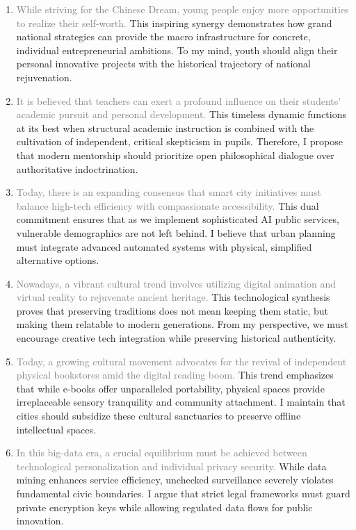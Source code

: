 ﻿\documentclass[lang=cn,11pt]{elegantbook}
\begin{document}
\begin{enumerate}
    \item \textcolor{gray}{While striving for the Chinese Dream, young people enjoy more opportunities to realize their self-worth.} This inspiring synergy demonstrates how grand national strategies can provide the macro infrastructure for concrete, individual entrepreneurial ambitions. To my mind, youth should align their personal innovative projects with the historical trajectory of national rejuvenation.
    \item \textcolor{gray}{It is believed that teachers can exert a profound influence on their students' academic pursuit and personal development.} This timeless dynamic functions at its best when structural academic instruction is combined with the cultivation of independent, critical skepticism in pupils. Therefore, I propose that modern mentorship should prioritize open philosophical dialogue over authoritative indoctrination.
    \item \textcolor{gray}{Today, there is an expanding consensus that smart city initiatives must balance high-tech efficiency with compassionate accessibility.} This dual commitment ensures that as we implement sophisticated AI public services, vulnerable demographics are not left behind. I believe that urban planning must integrate advanced automated systems with physical, simplified alternative options.
    \item \textcolor{gray}{Nowadays, a vibrant cultural trend involves utilizing digital animation and virtual reality to rejuvenate ancient heritage.} This technological synthesis proves that preserving traditions does not mean keeping them static, but making them relatable to modern generations. From my perspective, we must encourage creative tech integration while preserving historical authenticity.
    \item \textcolor{gray}{Today, a growing cultural movement advocates for the revival of independent physical bookstores amid the digital reading boom.} This trend emphasizes that while e-books offer unparalleled portability, physical spaces provide irreplaceable sensory tranquility and community attachment. I maintain that cities should subsidize these cultural sanctuaries to preserve offline intellectual spaces.
    \item \textcolor{gray}{In this big-data era, a crucial equilibrium must be achieved between technological personalization and individual privacy security.} While data mining enhances service efficiency, unchecked surveillance severely violates fundamental civic boundaries. I argue that strict legal frameworks must guard private encryption keys while allowing regulated data flows for public innovation.

\end{enumerate}
\end{document}
